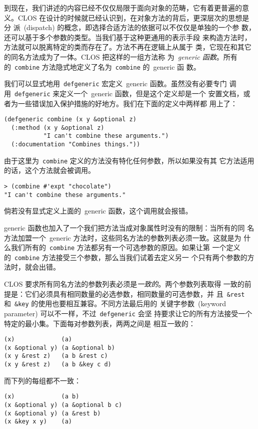 到现在，我们讲述的内容已经不仅仅局限于面向对象的范畴，它有着更普遍的意
义。CLOS 在设计的时候就已经认识到，在对象方法的背后，更深层次的思想是分
派~(dispatch) 的概念，即选择合适方法的依据可以不仅仅是单独的一个参
数，还可以基于多个参数的类型。当我们基于这种更通用的表示手段
来构造方法时，方法就可以脱离特定的类而存在了。方法不再在逻辑上从属于
类，它现在和其它的同名方法成为了一体。CLOS 把这样的一组方法称
为~\emph{generic 函数}。所有
的~\texttt{combine} 方法隐式地定义了名为~\texttt{combine} 的~generic 函
数。

我们可以显式地用~\texttt{defgeneric} 
宏定义~generic 函数。虽然没有必要专门
调用~\texttt{defgeneric} 来定义一个~generic 函数，但是这个定义却是一个
安置文档，或者为一些错误加入保护措施的好地方。我们在下面的定义中两样都
用上了：
\begin{lstlisting}
(defgeneric combine (x y &optional z)
  (:method (x y &optional z)
           "I can't combine these arguments.")
  (:documentation "Combines things."))
\end{lstlisting}
由于这里为~\texttt{combine} 定义的方法没有特化任何参数，所以如果没有其
它方法适用的话，这个方法就会被调用。
\begin{lstlisting}
> (combine #'expt "chocolate")
"I can't combine these arguments."
\end{lstlisting}
倘若没有显式定义上面的~generic 函数，这个调用就会报错。

generic 函数也加入了一个我们把方法当成对象属性时没有的限制：当所有的同
名方法加盟一个~generic 方法时，这些同名方法的参数列表必须一致。这就是为
什么我们所有的~\texttt{combine} 方法都另有一个可选参数的原因。如果让第
一个定义的~\texttt{combine} 方法接受三个参数，那么当我们试着去定义另一
个只有两个参数的方法时，就会出错。

CLOS 要求所有同名方法的参数列表必须是\emph{一致的}。两个参数列表取得
一致的前提是：它们必须具有相同数量的必选参数，相同数量的可选参数，并
且~\texttt{\&rest} 和~\texttt{\&key} 的使用也要相互兼容。不同方法最后用的
关键字参数~(keyword parameter) 可以不一样，不过~\texttt{defgeneric} 会坚
持要求让它的所有方法接受一个特定的最小集。下面每对参数列表，两两之间是
相互一致的：
\begin{lstlisting}
(x)             (a)
(x &optional y) (a &optional b)
(x y &rest z)   (a b &rest c)
(x y &rest z)   (a b &key c d)
\end{lstlisting}
而下列的每组都不一致：
\begin{lstlisting}
(x)             (a b)
(x &optional y) (a &optional b c)
(x &optional y) (a &rest b)
(x &key x y)    (a)
\end{lstlisting}

